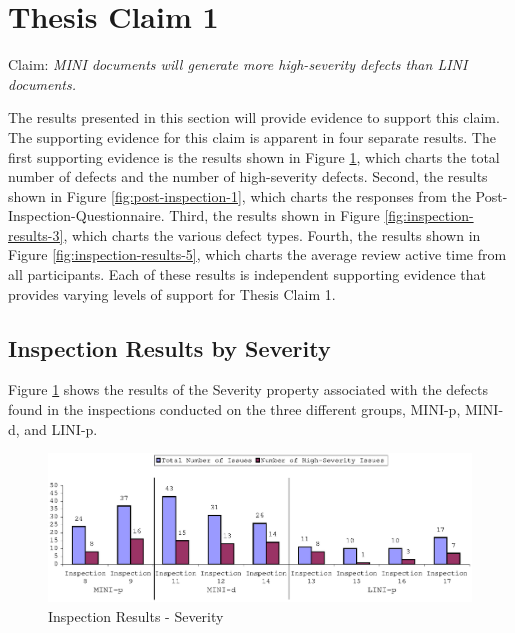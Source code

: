 \clearpage
\section{Thesis Claim 1}
\label{section:claim1}
\noindent Claim: \textit{MINI documents will generate more high-severity
  defects than LINI documents.} \newline 

The results presented in this section will provide evidence to support this
claim. The supporting evidence for this claim is apparent in four separate
results. The first supporting evidence is the results shown in Figure
\ref{fig:inspection-results-1}, which charts the total number of defects
and the number of high-severity defects. Second, the results shown in
Figure \ref{fig:post-inspection-1}, which charts the responses from the
Post-Inspection-Questionnaire. Third, the results shown in Figure
\ref{fig:inspection-results-3}, which charts the various defect types.
Fourth, the results shown in Figure \ref{fig:inspection-results-5}, which
charts the average review active time from all participants. Each of these
results is independent supporting evidence that provides varying levels of
support for Thesis Claim 1.

\subsection{Inspection Results by Severity}
Figure \ref{fig:inspection-results-1} shows the results of the Severity
property associated with the defects found in the inspections conducted on
the three different groups, MINI-p, MINI-d, and LINI-p.

\begin{figure}[!h]
  \centering
  \includegraphics[width=1.0\textwidth]{figs/Results/inspection-results-1.eps}
  \caption{Inspection Results - Severity}
  \label{fig:inspection-results-1}
\end{figure}

